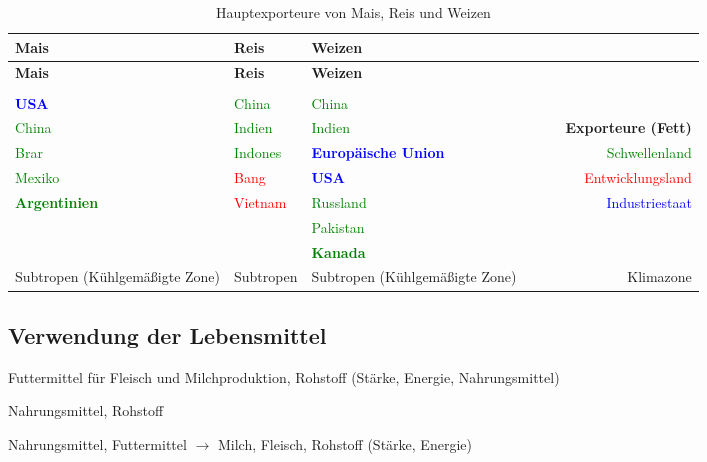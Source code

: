 \renewcommand{\longtableheader}{\textbf{Mais} & \textbf{Reis}
& \textbf{Weizen} \\}
\newcommand{\Schwelllc}[1]{\textcolor{green}{#1}}
\newcommand{\Entwickllc}[1]{\textcolor{red}{#1}}
\newcommand{\Industrielc}[1]{\textcolor{blue}{#1}}
\newcommand{\Exportll}[1]{\textbf{#1}}
\begin{longtable}{p{3cm}p{3cm}p{3cm}r}
	\longtableheader
	\endfirsthead

	\longtableheader
	\endhead

	\caption{Hauptexporteure von Mais, Reis und Weizen}
	\endlastfoot

	\multicolumn{3}{r}{\longtableendfoot} & \\
	\endfoot

	\Industrielc{\Exportll{USA}}		& \Schwelllc{China}				& \Schwelllc{China}				& \\
	\Schwelllc{China}					& \Schwelllc{Indien}			& \Schwelllc{Indien}
	& ~~~~~\Exportll{Exporteure (Fett)} \\
	\Schwelllc{Brar}					& \Schwelllc{Indones}			& \Industrielc{\Exportll{Europäische Union}}
	& ~~~~~\Schwelllc{Schwellenland} \\
	\Schwelllc{Mexiko}		& \Entwickllc{Bang}			& \Industrielc{\Exportll{USA}}
	& ~~~~~\Entwickllc{Entwicklungsland} \\
	\Schwelllc{\Exportll{Argentinien}}	& \Entwickllc{Vietnam}			& \Schwelllc{Russland}
	& ~~~~~\Industrielc{Industriestaat} \\
										&								& \Schwelllc{Pakistan}			& \\
										&								& \Schwelllc{\Exportll{Kanada}}			& \\
	Subtropen (Kühlgemäßigte Zone)	& Subtropen						& Subtropen (Kühlgemäßigte Zone)&
	 ~~~~~Klimazone\\
\end{longtable}

\subsection{Verwendung der Lebensmittel}
\begin{eqlist}
	\item[Mais:] Futtermittel für Fleisch und Milchproduktion, Rohstoff (Stärke, Energie, Nahrungsmittel)
	\item[Reis:] Nahrungsmittel, Rohstoff
	\item[Weizen:] Nahrungsmittel, Futtermittel $\rightarrow$ Milch, Fleisch, Rohstoff (Stärke, Energie)
\end{eqlist}

